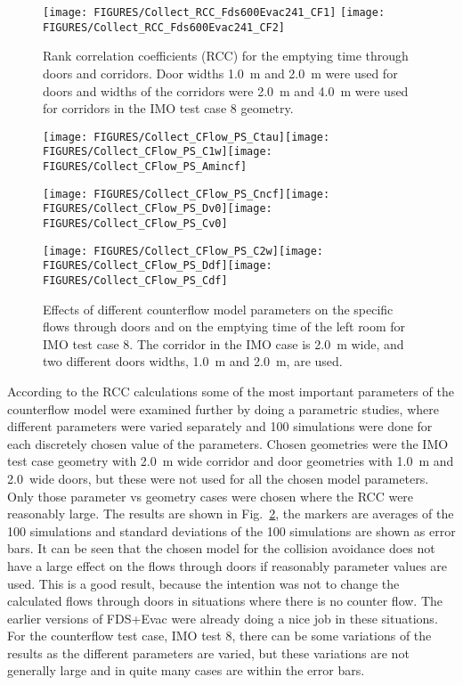 \documentclass[12pt,a4paper,final,twoside]{stylevk}
\begin{document}
%
\begin{figure}[!tb]
  \centerline{\texttt{[image: FIGURES/Collect\_RCC\_Fds600Evac241\_CF1]}  
      \texttt{[image: FIGURES/Collect\_RCC\_Fds600Evac241\_CF2]} } 
  \caption{Rank correlation coefficients (RCC) for the emptying time
    through doors and corridors.  Door widths 1.0~m and 2.0~m were
    used for doors and widths of the corridors were 2.0~m and 4.0~m
    were used for corridors in the IMO test case 8
    geometry.}\label{Fig_RCC_CF}
\end{figure}
%

%
\begin{figure}[!ht]
  \centerline{ \texttt{[image: FIGURES/Collect\_CFlow\_PS\_Ctau]}\texttt{[image: FIGURES/Collect\_CFlow\_PS\_C1w]}\texttt{[image: FIGURES/Collect\_CFlow\_PS\_Amincf]} }  
  \centerline{ \texttt{[image: FIGURES/Collect\_CFlow\_PS\_Cncf]}\texttt{[image: FIGURES/Collect\_CFlow\_PS\_Dv0]}\texttt{[image: FIGURES/Collect\_CFlow\_PS\_Cv0]} }  
  \centerline{ \texttt{[image: FIGURES/Collect\_CFlow\_PS\_C2w]}\texttt{[image: FIGURES/Collect\_CFlow\_PS\_Ddf]}\texttt{[image: FIGURES/Collect\_CFlow\_PS\_Cdf]} }  
  \caption{Effects of different counterflow model parameters on the
    specific flows through doors and on the emptying time of the left
    room for IMO test case 8.  The corridor in the IMO case is 2.0~m
    wide, and two different doors widths, 1.0~m and 2.0~m, are
    used.}\label{Fig_CFParametric}
\end{figure}
%

According to the RCC calculations some of the most important
parameters of the counterflow model were examined further by doing a
parametric studies, where different parameters were varied separately
and 100 simulations were done for each discretely chosen value of the
parameters.  Chosen geometries were the IMO test case geometry with
2.0~m wide corridor and door geometries with 1.0~m and 2.0~wide doors,
but these were not used for all the chosen model parameters.  Only
those parameter vs geometry cases were chosen where the RCC were
reasonably large.  The results are shown in
Fig.~\ref{Fig_CFParametric}, the markers are averages of the 100
simulations and standard deviations of the 100 simulations are shown
as error bars.  It can be seen that the chosen model for the collision
avoidance does not have a large effect on the flows through doors if
reasonably parameter values are used.  This is a good result, because
the intention was not to change the calculated flows through doors in
situations where there is no counter flow.  The earlier versions of
FDS+Evac were already doing a nice job in these situations.  For the
counterflow test case, IMO test 8, there can be some variations of the
results as the different parameters are varied, but these variations
are not generally large and in quite many cases are within the error
bars.
\end{document}
